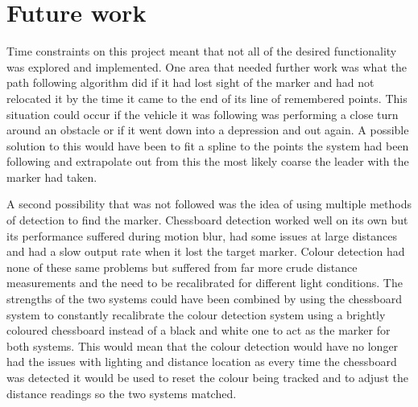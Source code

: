 \section{Future work}
Time constraints on this project meant that not all of the desired functionality was explored and implemented. One area that needed further work was what the path following algorithm did if it had lost sight of the marker and had not relocated it by the time it came to the end of its line of remembered points. This situation could occur if the vehicle it was following was performing a close turn around an obstacle or if it went down into a depression and out again. A possible solution to this would have been to fit a spline to the points the system had been following and extrapolate out from this the most likely coarse the leader with the marker had taken. 

A second possibility that was not followed was the idea of using multiple methods of detection to find the marker. Chessboard detection worked well on its own but its performance suffered during motion blur, had some issues at large distances and had a slow output rate when it lost the target marker. Colour detection had none of these same problems but suffered from far more crude distance measurements and the need to be recalibrated for different light conditions. The strengths of the two systems could have been combined by using the chessboard system to constantly recalibrate the colour detection system using a brightly coloured chessboard instead of a black and white one to act as the marker for both systems. This would mean that the colour detection would have no longer had the issues with lighting and distance location as every time the chessboard was detected it would be used to reset the colour being tracked and to adjust the distance readings so the two systems matched.